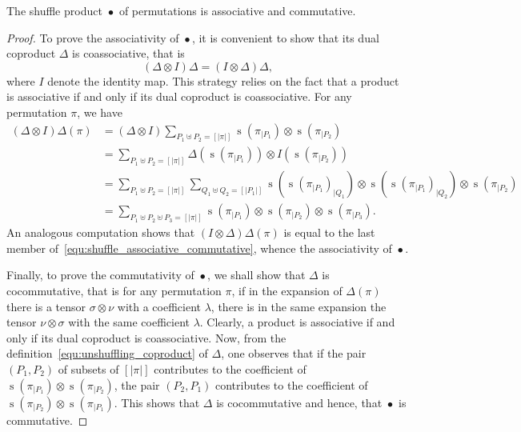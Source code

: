 \documentclass[a4paper,10pt]{llncs}
\DeclareMathOperator{\STD}{\mathrm{s}}
\DeclareMathOperator{\SHUFFLE}{\bullet}
\begin{document}
\begin{proposition} \label{prop:shuffle_associative_commutative}
    The shuffle product $\SHUFFLE$ of permutations is associative and
    commutative.
\end{proposition}
\begin{proof}
    To prove the associativity of $\SHUFFLE$, it is convenient to show
    that its dual coproduct $\Delta$ is coassociative, that is
    \begin{equation}
        (\Delta \otimes I) \Delta = (I \otimes \Delta) \Delta,
    \end{equation}
    where $I$ denote the identity map. This strategy relies on the fact
    that a product is associative if and only if its dual coproduct is
    coassociative. For any permutation $\pi$, we have
    \begin{equation} \begin{split}
    \label{equ:shuffle_associative_commutative}
        (\Delta \otimes I) \Delta(\pi) & =
        (\Delta \otimes I)
        \sum_{P_1 \uplus P_2 = [|\pi|]}
        \STD\left(\pi_{|P_1}\right) \otimes \STD\left(\pi_{|P_2}\right) \\
        & =
        \sum_{P_1 \uplus P_2 = [|\pi|]}
        \Delta\left(\STD\left(\pi_{|P_1}\right)\right)
        \otimes I\left(\STD\left(\pi_{|P_2}\right)\right) \\
        & =
        \sum_{P_1 \uplus P_2 = [|\pi|]}
        \sum_{Q_1 \uplus Q_2 = [|P_1|]}
        \STD\left(\STD\left(\pi_{|P_1}\right)_{|Q_1}\right)
        \otimes
        \STD\left(\STD\left(\pi_{|P_1}\right)_{|Q_2}\right)
        \otimes \STD\left(\pi_{|P_2}\right) \\
        & =
        \sum_{P_1 \uplus P_2 \uplus P_3 = [|\pi|]}
        \STD\left(\pi_{|P_1}\right) \otimes
        \STD\left(\pi_{|P_2}\right) \otimes
        \STD\left(\pi_{|P_3}\right).
    \end{split} \end{equation}
    An analogous computation shows that $(I \otimes \Delta) \Delta(\pi)$
    is equal to the last member of~\eqref{equ:shuffle_associative_commutative},
    whence the associativity of $\SHUFFLE$.
    \smallskip

    Finally, to prove the commutativity of $\SHUFFLE$, we shall show
    that $\Delta$ is cocommutative, that is for any permutation $\pi$,
    if in the expansion of $\Delta(\pi)$ there is a tensor
    $\sigma \otimes \nu$ with a coefficient $\lambda$, there is in the
    same expansion the tensor $\nu \otimes \sigma$ with the same
    coefficient $\lambda$. Clearly, a product is associative if and only
    if its dual coproduct is coassociative. Now, from the
    definition~\eqref{equ:unshuffling_coproduct} of $\Delta$, one
    observes that if the pair $(P_1, P_2)$ of subsets of $[|\pi|]$
    contributes to the coefficient of
    $\STD\left(\pi_{|P_1}\right) \otimes \STD\left(\pi_{|P_2}\right)$,
    the pair $(P_2, P_1)$ contributes to the coefficient of
    $\STD\left(\pi_{|P_2}\right) \otimes \STD\left(\pi_{|P_1}\right)$.
    This shows that $\Delta$ is cocommutative and hence, that $\SHUFFLE$
    is commutative.
\end{proof}
\medskip
\end{document}
